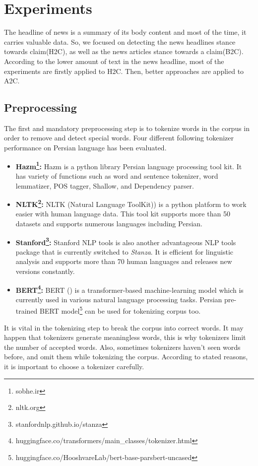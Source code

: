 \section{Experiments}
The headline of news is a summary of its body content and most of the time, it carries valuable data. So, we focused on detecting the news headlines stance towards claim(H2C), as well as the news articles stance towards a claim(B2C). According to the lower amount of text in the news headline, most of the experiments are firstly applied to H2C. Then, better approaches are applied to A2C.  
\subsection{Preprocessing}
The first and mandatory preprocessing step is to tokenize words in the corpus in order to remove and detect special words. Four different following tokenizer performance on Persian language has been evaluated. 
\begin{itemize}
	\item \textbf{Hazm\footnote{sobhe.ir}:}
	Hazm is a python library Persian language processing tool kit. It has variety of functions such as word and sentence tokenizer, word lemmatizer, POS tagger, Shallow, and Dependency parser.
	
	\item \textbf{NLTK\footnote{nltk.org}:}
	NLTK (Natural Language ToolKit)) is a python platform to work easier with human language data. This tool kit supports more than 50 datasets and supports numerous languages including Persian. 
	
	\item \textbf{Stanford\footnote{stanfordnlp.github.io/stanza}:}
	Stanford NLP tools is also another advantageous NLP tools package that is currently switched to \textit{Stanza}. It is efficient for linguistic analysis and supports more than 70 human languages and releases new versions constantly.
	
	\item \textbf{BERT\footnote{huggingface.co/transformers/main\_classes/tokenizer.html}:}
	BERT (\cite{bert}) is a transformer-based machine-learning model which is currently used in various natural language processing tasks. Persian pre-trained BERT model\footnote{huggingface.co/HooshvareLab/bert-base-parsbert-uncased} can be used for tokenizing corpus too. 
\end{itemize}

It is vital in the tokenizing step to break the corpus into correct words. It may happen that tokenizers generate meaningless words, this is why tokenizers limit the number of accepted words. Also, sometimes tokenizers haven't seen words before, and omit them while tokenizing the corpus. According to stated reasons, it is important to choose a tokenizer carefully.


